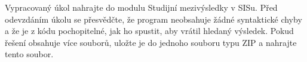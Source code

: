 \documentclass[a4paper,11pt,twoside]{article}
\begin{document}
Vypracovaný úkol nahrajte do modulu Studijní mezivýsledky v SISu.
Před odevzdáním úkolu se přesvědčte, že program neobsahuje žádné syntaktické chyby a že je z kódu pochopitelné, jak ho spustit, aby vrátil hledaný výsledek.
Pokud řešení obsahuje více souborů, uložte je do jednoho souboru typu ZIP a nahrajte tento soubor.
\end{document}
